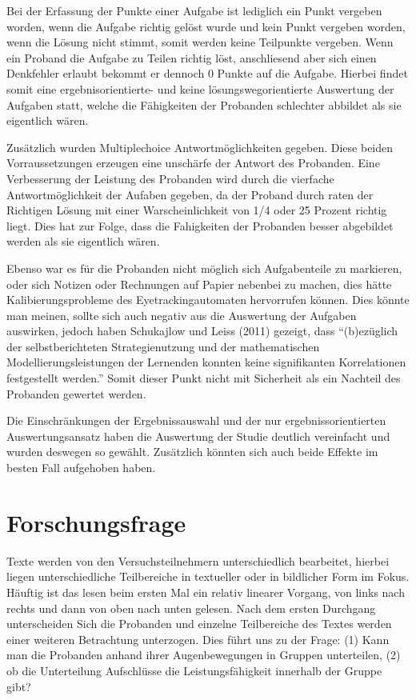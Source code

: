 Bei der Erfassung der Punkte einer Aufgabe ist lediglich ein Punkt vergeben worden, wenn die Aufgabe richtig gelöst wurde und kein Punkt vergeben worden, wenn die Lösung nicht stimmt, somit werden keine Teilpunkte vergeben. Wenn ein Proband die Aufgabe zu Teilen richtig löst, anschliesend aber sich einen Denkfehler erlaubt bekommt er dennoch 0 Punkte auf die Aufgabe. Hierbei findet somit eine ergebnisorientierte- und keine lösungswegorientierte Auswertung der Aufgaben statt, welche die Fähigkeiten der Probanden schlechter abbildet als sie eigentlich wären.

Zusätzlich wurden Multiplechoice Antwortmöglichkeiten gegeben. Diese beiden Vorraussetzungen erzeugen eine unschärfe der Antwort des Probanden. Eine Verbesserung der Leistung des Probanden wird durch die vierfache Antwortmöglichkeit der Aufaben gegeben, da der Proband durch raten der Richtigen Lösung mit einer Warscheinlichkeit von 1/4 oder 25 Prozent richtig liegt. Dies hat zur Folge, dass die Fahigkeiten der Probanden besser abgebildet werden als sie eigentlich wären.  

Ebenso war es für die Probanden nicht möglich sich Aufgabenteile zu markieren, oder sich Notizen oder Rechnungen auf Papier nebenbei zu machen, dies hätte Kalibierungsprobleme des Eyetrackingautomaten hervorrufen können. Dies könnte man meinen, sollte sich auch negativ aus die Auswertung der Aufgaben auswirken, jedoch haben Schukajlow und Leiss (2011) gezeigt, dass ``(b)ezüglich der selbstberichteten Strategienutzung und der mathematischen Modellierungsleistungen der Lernenden konnten keine signifikanten Korrelationen festgestellt werden.'' Somit dieser Punkt nicht mit Sicherheit als ein Nachteil des Probanden gewertet werden. 

Die Einschränkungen der Ergebnissauswahl und der nur ergebnissorientierten Auswertungsansatz haben die Auswertung der Studie deutlich vereinfacht und wurden deswegen so gewählt. Zusätzlich könnten sich auch beide Effekte im besten Fall aufgehoben haben.  

\section{Forschungsfrage}
Texte werden von den Versuchsteilnehmern unterschiedlich bearbeitet, hierbei liegen unterschiedliche Teilbereiche in textueller oder in bildlicher Form im Fokus. Häuftig ist das lesen beim ersten Mal ein relativ linearer Vorgang, von links nach rechts und dann von oben nach unten gelesen. Nach dem ersten Durchgang unterscheiden Sich die Probanden und einzelne Teilbereiche des Textes werden einer weiteren Betrachtung unterzogen. Dies führt uns zu der Frage:
(1) Kann man die Probanden anhand ihrer Augenbewegungen in Gruppen unterteilen, (2) ob die Unterteilung Aufschlüsse die Leistungsfähigkeit innerhalb der Gruppe gibt?

